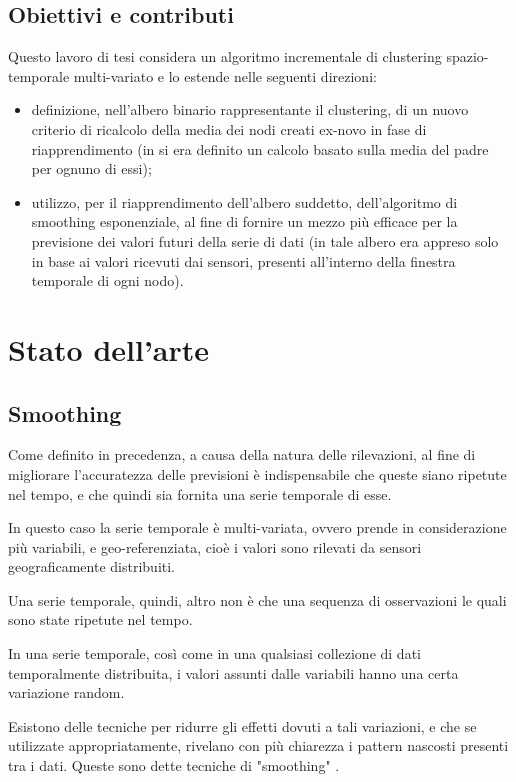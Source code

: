 \documentclass[12pt,a4paper,twoside,openright]{book}
\begin{document}
\section{Obiettivi e contributi}
Questo lavoro di tesi considera un algoritmo incrementale di clustering spazio-temporale multi-variato e lo estende nelle seguenti direzioni: 
\begin{itemize}
\item definizione, nell’albero binario rappresentante il clustering, di un nuovo criterio di ricalcolo della media dei nodi creati ex-novo in fase di riapprendimento (in \cite{donato} si era definito un calcolo basato sulla media del padre per ognuno di essi);
\item utilizzo, per il riapprendimento dell’albero suddetto, dell’algoritmo di smoothing esponenziale, al fine di fornire un mezzo più efficace per la previsione dei valori futuri della serie di dati (in \cite{donato} tale albero era appreso solo in base ai valori ricevuti dai sensori, presenti all’interno della finestra temporale di ogni nodo).
\end{itemize}
\chapter{Stato dell'arte}
\section{Smoothing}
Come definito in precedenza, a causa della natura delle rilevazioni, al fine di migliorare l'accuratezza delle previsioni è indispensabile che queste siano ripetute nel tempo, e che quindi sia fornita una serie temporale di esse.

In questo caso la serie temporale è multi-variata, ovvero prende in considerazione più variabili, e geo-referenziata, cioè i valori sono rilevati da sensori geograficamente distribuiti.

Una serie temporale, quindi, altro non è che una sequenza di osservazioni le quali sono state ripetute nel tempo. 

In una serie temporale, così come in una qualsiasi collezione di dati temporalmente distribuita, i valori assunti dalle variabili hanno una certa variazione random. 

Esistono delle tecniche per ridurre gli effetti dovuti a tali variazioni, e che se utilizzate appropriatamente, rivelano con più chiarezza i pattern nascosti presenti tra i dati. Queste sono dette tecniche di "smoothing" \cite{5a}. 
\end{document}
